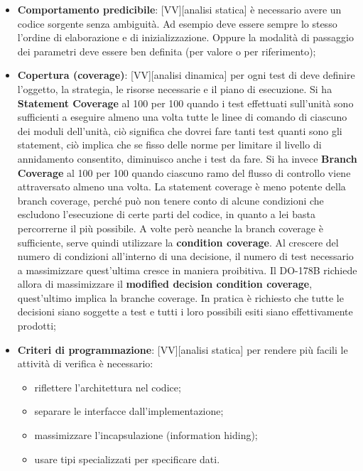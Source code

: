 \begin{itemize}
		\item \textbf{Comportamento predicibile}: [VV][analisi statica] è necessario avere un codice sorgente senza ambiguità. Ad esempio deve essere sempre lo stesso l'ordine di elaborazione e di inizializzazione. Oppure la modalità di passaggio dei parametri deve essere ben definita (per valore o per riferimento);

		\item \textbf{Copertura (coverage)}: [VV][analisi dinamica] per ogni test di deve definire l'oggetto, la strategia, le risorse necessarie e il piano di esecuzione. Si ha \textbf{Statement Coverage} al 100 per 100 quando i test effettuati sull'unità sono sufficienti a eseguire almeno una volta tutte le linee di comando di ciascuno dei moduli dell'unità, ciò significa che dovrei fare tanti test quanti sono gli statement, ciò implica che se fisso delle norme per limitare il livello di annidamento consentito, diminuisco anche i test da fare. Si ha invece \textbf{Branch Coverage} al 100 per 100 quando ciascuno ramo del flusso di controllo viene attraversato almeno una volta. \newline
		La statement coverage è meno potente della branch coverage, perché può non tenere conto di alcune condizioni che escludono l'esecuzione di certe parti del codice, in quanto a lei basta percorrerne il più possibile. A volte però neanche la branch coverage è sufficiente, serve quindi utilizzare la \textbf{condition coverage}. Al crescere del numero di condizioni all'interno di una decisione, il numero di test necessario a massimizzare quest'ultima cresce in maniera proibitiva. Il DO-178B richiede allora di massimizzare il \textbf{modified decision condition coverage}, quest'ultimo implica la branche coverage. In pratica è richiesto che tutte le decisioni siano soggette a test e tutti i loro possibili esiti siano effettivamente prodotti;


		\item \textbf{Criteri di programmazione}: [VV][analisi statica] per rendere più facili le attività di verifica è necessario:
			\begin{itemize}
				\item riflettere l'architettura nel codice;
				\item separare le interfacce dall'implementazione;
				\item massimizzare l'incapsulazione (information hiding);
				\item usare tipi specializzati per specificare dati. 
			\end{itemize}


\end{itemize}
